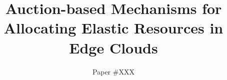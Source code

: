 \documentclass[sigconf]{aamas}  %
\begin{document}
    \title{Auction-based Mechanisms for Allocating Elastic Resources in Edge Clouds}  %


    \author{Paper \#XXX}  %

\end{document}
